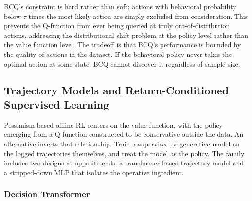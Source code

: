BCQ's constraint is hard rather than soft: actions with behavioral probability below $\tau$ times the most likely action are simply excluded from consideration. This prevents the Q-function from ever being queried at truly out-of-distribution actions, addressing the distributional shift problem at the policy level rather than the value function level. The tradeoff is that BCQ's performance is bounded by the quality of actions in the dataset. If the behavioral policy never takes the optimal action at some state, BCQ cannot discover it regardless of sample size.

\subsection{Trajectory Models and Return-Conditioned Supervised Learning}
\label{sec:dt_rvs}

Pessimism-based offline RL centers on the value function, with the policy emerging from a Q-function constructed to be conservative outside the data. An alternative inverts that relationship. Train a supervised or generative model on the logged trajectories themselves, and treat the model as the policy. The family includes two designs at opposite ends: a transformer-based trajectory model and a stripped-down MLP that isolates the operative ingredient.

\subsubsection{Decision Transformer}

